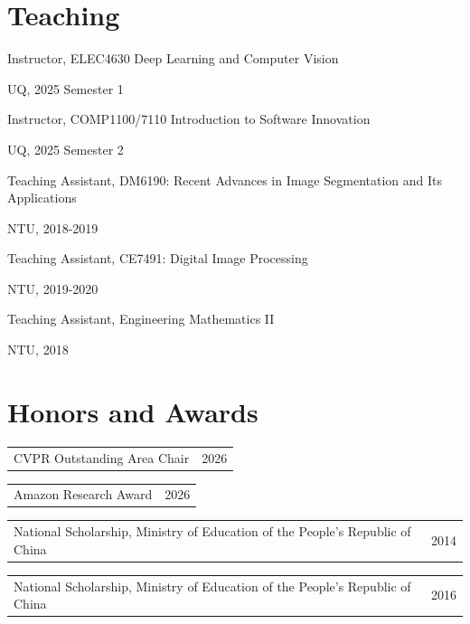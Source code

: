 \documentclass[11pt,letterpaper]{article}
\makeatletter
\newcommand{\cvService}[2]{\par\begin{tabularx}{\linewidth}{@{}Xr@{}}#1 & #2\end{tabularx}\par}
\makeatother
\begin{document}
\section*{Teaching}
Instructor, ELEC4630 Deep Learning and Computer Vision\par\nopagebreak
UQ, 2025 Semester 1\par
{}Instructor, COMP1100/7110 Introduction to Software Innovation\par\nopagebreak
UQ, 2025 Semester 2\par
{}Teaching Assistant, DM6190: Recent Advances in Image Segmentation and Its Applications\par\nopagebreak
NTU, 2018-2019\par
{}Teaching Assistant, CE7491: Digital Image Processing\par\nopagebreak
NTU, 2019-2020\par
{}Teaching Assistant, Engineering Mathematics II\par\nopagebreak
NTU, 2018\par
\section*{Honors and Awards}
\cvService{CVPR Outstanding Area Chair}{2026}
\cvService{Amazon Research Award}{2026}
\cvService{National Scholarship, Ministry of Education of the People's Republic of China}{2014}
\cvService{National Scholarship, Ministry of Education of the People's Republic of China}{2016}
\end{document}
